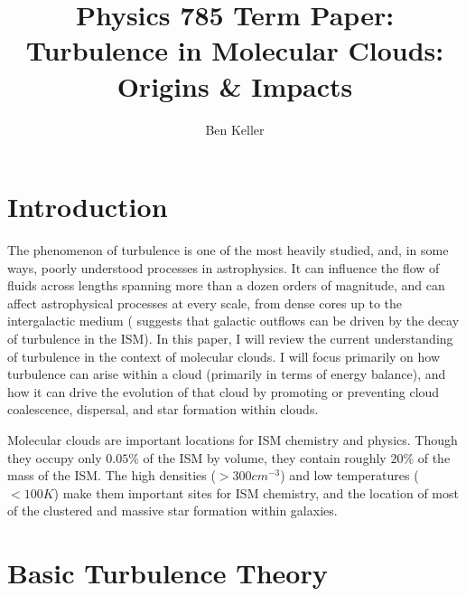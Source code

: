 \documentclass[12pt, preprint]{aastex}
\begin{document}
\title{Physics 785 Term Paper: Turbulence in Molecular Clouds: Origins \&
Impacts}
\author{Ben Keller}
\maketitle
\newpage
\section{Introduction}
The phenomenon of turbulence is one of the most heavily studied, and, in some
ways, poorly
understood processes in astrophysics.  It can influence the flow of fluids across
lengths spanning more than a dozen orders of magnitude, and can affect
astrophysical processes at every scale, from dense cores \citep{larson1981} up to the intergalactic
medium (\citet{scan2013} suggests that galactic outflows can be
driven by the decay of turbulence in the ISM).  In this paper, I will review 
the current understanding of turbulence in the context of molecular clouds.  I
will focus primarily on how turbulence can arise within a cloud (primarily in terms of
energy balance), and how it can drive the evolution of that cloud by promoting
or preventing cloud coalescence, dispersal, and star formation within clouds.

Molecular clouds are important locations for ISM chemistry and physics.  Though
they occupy only $0.05\%$ of the ISM by volume, they contain roughly $20\%$ of
the mass of the ISM.  The high densities ($>300 cm^{-3}$) and low temperatures
($<100K$) make them important sites for ISM chemistry, and the location of most of
the clustered and massive star formation within galaxies\citep{tiel2010}.

\section{Basic Turbulence Theory}
\end{document}
